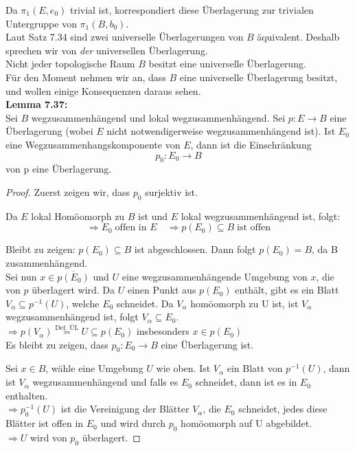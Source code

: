 \documentclass[fleqn, 12pt, letterpaper]{article}
\newcommand{\txt}[1]{\text{#1}}
\begin{document}
Da \( \pi_1(E, e_0) \) trivial ist, korrespondiert diese Überlagerung zur trivialen Untergruppe von \( \pi_1(B, b_0) \).\\

Laut {Satz 7.34} sind zwei universelle Überlagerungen von \( B \) äquivalent. Deshalb sprechen wir von \emph{der} universellen Überlagerung.\\

Nicht jeder topologische Raum \( B \) besitzt eine universelle Überlagerung.\\

Für den Moment nehmen wir an, dass \( B \) eine universelle Überlagerung besitzt, und wollen einige Konsequenzen daraus sehen.\\

\textbf{Lemma 7.37:} \\
Sei \( B \) wegzusammenhängend und lokal wegzusammenhängend. Sei \( p : E \to B \) eine Überlagerung (wobei \( E \) nicht notwendigerweise wegzusammenhängend ist). Ist \( E_0 \) eine Wegzusammenhangskomponente von \( E \), dann ist die Einschränkung
\[
p_0 : E_0 \to B
\]
von p eine Überlagerung.

\begin{proof}
Zuerst zeigen wir, dass \( p_0 \) surjektiv ist.

Da \( E \) lokal Homöomorph zu \( B \) ist und \( E \) lokal wegzusammenhängend ist, folgt:
\[\Rightarrow E_0 \;\txt{offen in } E \quad \Rightarrow p(E_0)\subseteq B \;\txt{ist offen}\]

Bleibt zu zeigen: $ p(E_0)\subseteq B$ ist abgeschlossen. Dann folgt $p(E_0)=B$, da B zusammenhängend.\\

Sei nun \( x \in \overline{p(E_0)} \) und \( U \) eine wegzusammenhängende Umgebung von $x$, die von \( p \) überlagert wird. Da \( U \) einen Punkt aus \( p(E_0) \) enthält, gibt es ein Blatt \( V _\alpha\subseteq p^{-1}(U) \), welche \( E_0 \) schneidet. Da \( V_\alpha \) homöomorph zu U ist, ist \( V_\alpha \) wegzusammenhängend ist, folgt \( V_\alpha \subseteq E_0 \).\\

\(\Rightarrow p(V_\alpha)\overset{\txt{Def. ÜL}}{=}U\subseteq p(E_0)\) insbesonders $x\in p(E_0)$\\

Es bleibt zu zeigen, dass \( p_0 : E_0 \to B \) eine Überlagerung ist.

Sei \( x \in B \), wähle eine Umgebung \( U\) wie oben. Ist $V_\alpha$ ein Blatt von $p^{-1}(U)$, dann ist $V_\alpha$ wegzusammenhängend und falls es $E_0$ schneidet, dann ist es in $E_0$ enthalten. \\

\( \Rightarrow p_0^{-1}(U) \) ist die Vereinigung der Blätter $V_\alpha$, die $E_0$ schneidet, jedes diese Blätter ist offen in $E_0$ und wird durch $p_0$ homöomorph auf U abgebildet.\\

\(\Rightarrow U\) wird von $p_0$ überlagert.

\end{proof}
\end{document}
